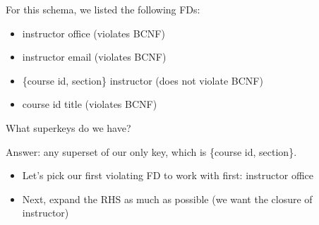 \documentclass{../cheatsheet}
\begin{document}
\begin{multicols*}{2}
    For this schema, we listed the following FDs:

    \begin{itemize}
        \item instructor \textrightarrow office (violates BCNF)
        \item instructor \textrightarrow email (violates BCNF)
        \item \{course id, section\} \textrightarrow instructor (does not violate
            BCNF)
        \item course id \textrightarrow title (violates BCNF)
    \end{itemize}

    What superkeys do we have?

    Answer: any superset of our only key, which is \{course id, section\}.

    \begin{itemize}
        \item Let's pick our first violating FD to work with first: instructor
            \textrightarrow office
        \item Next, expand the RHS as much as possible (we want the closure of
            instructor)


\end{itemize}
\end{multicols*}
\end{document}
